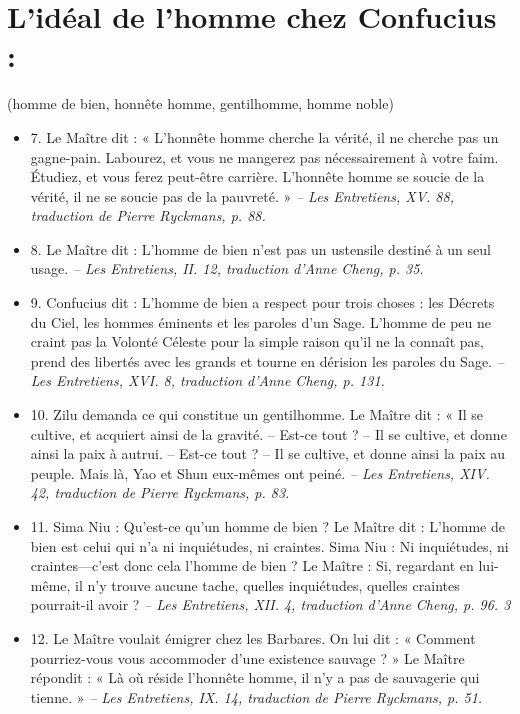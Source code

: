 \section{L’idéal de l’homme chez Confucius :}  
\begin{Def}[Le junzi 君子]
     (homme de bien, honnête homme, gentilhomme, homme noble)   
\end{Def}
\begin{itemize}
    
\item 7. \newline Le Maître dit : « L’honnête homme cherche la vérité, il ne cherche pas un gagne-pain. Labourez, et vous ne mangerez pas nécessairement à votre faim. Étudiez, et vous ferez peut-être carrière. L’honnête homme se soucie de la vérité, il ne se soucie pas de la pauvreté. » \textit{\small -- Les Entretiens, XV. 88, traduction de Pierre Ryckmans, p. 88. } 
\item 8. \newline Le Maître dit : L’homme de bien n’est pas un ustensile destiné à un seul usage. \textit{\small -- Les Entretiens, II. 12, traduction d’Anne Cheng, p. 35.  }
\item 9. \newline Confucius dit : L’homme de bien a respect pour trois choses : les Décrets du Ciel, les hommes éminents et les paroles d’un Sage. L’homme de peu ne craint pas la Volonté Céleste pour la simple raison qu’il ne la connaît pas, prend des libertés avec les grands et tourne en dérision les paroles du Sage. \textit{\small -- Les Entretiens, XVI. 8, traduction d’Anne Cheng, p. 131. }
\item 10. \newline Zilu demanda ce qui constitue un gentilhomme. \newline Le Maître dit : « Il se cultive, et acquiert ainsi de la gravité. – Est-ce tout ? – Il se cultive, et donne ainsi la paix à autrui. – Est-ce tout ? – Il se cultive, et donne ainsi la paix au peuple. Mais là, Yao et Shun eux-mêmes ont peiné. \textit{\small -- Les Entretiens, XIV. 42, traduction de Pierre Ryckmans, p. 83.  }
\item 11. \newline  Sima Niu : Qu’est-ce qu’un homme de bien ? \newline Le Maître dit : L’homme de bien est celui qui n’a ni inquiétudes, ni craintes. Sima Niu : Ni inquiétudes, ni craintes—c’est donc cela l’homme de bien ? \newline Le Maître : Si, regardant en lui-même, il n’y trouve aucune tache, quelles inquiétudes, quelles craintes pourrait-il avoir ? \textit{\small -- Les Entretiens, XII. 4, traduction d’Anne Cheng, p. 96.   3 }
\item 12. \newline Le Maître voulait émigrer chez les Barbares. On lui dit : « Comment pourriez-vous vous accommoder d’une existence sauvage ? » \newline Le Maître répondit : « Là où réside l’honnête homme, il n’y a pas de sauvagerie qui tienne. » \textit{\small -- Les Entretiens, IX. 14, traduction de Pierre Ryckmans, p. 51.  }


\end{itemize}
